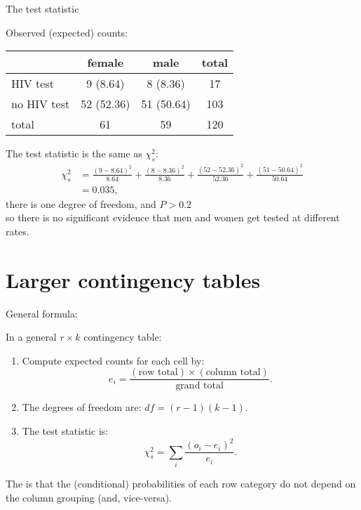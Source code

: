 \begin{frame}{The test statistic}

    Observed (expected) counts:
        \begin{center}
            \begin{tabular}{lcc|c}
                & female & male & total \\
                \hline
                HIV test & 9 (8.64) & 8 (8.36) & 17 \\
                no HIV test & 52 (52.36) & 51 (50.64) & 103 \\
                \hline
                total & 61 & 59 & 120 \\
            \end{tabular}
        \end{center}

    \vspace{2em}

    The test statistic is the \alert{same} as $\chi^2_s$:
    \begin{align*}
        \chi^2_s &= \frac{(9 - 8.64)^2}{8.64} + 
            \frac{(8 - 8.36)^2}{8.36} + 
            \frac{(52 - 52.36)^2}{52.36} + 
            \frac{(51 - 50.64)^2}{50.64} \\
          &= 0.035,
      \end{align*}
    there is \alert{one} {degree of freedom}, and $P > 0.2$ \\
    so there is no significant evidence that men and women get tested at different rates.


\end{frame}

\section{Larger contingency tables}

\begin{frame}{General formula:}

    In a general $r \times k$ contingency table:
    \begin{enumerate}
        \item Compute expected counts for each cell by:
            \[ e_i = \frac{ (\text{row total}) \times (\text{column total}) }{ \text{grand total} } . \]
        \item The degrees of freedom are: $df = (r-1)(k-1)$.
        \item The test statistic is:
            \[ \chi^2_s = \sum_i \frac{ ( o_i - e_i )^2 }{ e_i } . \]
    \end{enumerate}

    \vspace{2em}

    The  is that the (conditional) probabilities of each row category
    do not depend on the column grouping
    (and, vice-versa).

\end{frame}

